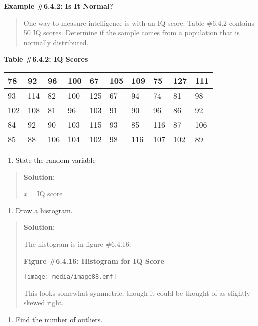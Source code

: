 \documentclass[]{book}
\providecommand{\tightlist}{%
  \setlength{\itemsep}{0pt}\setlength{\parskip}{0pt}}
\begin{document}
\textbf{Example \#6.4.2: Is It Normal?}

\begin{quote}
One way to measure intelligence is with an IQ score. Table \#6.4.2
contains 50 IQ scores. Determine if the sample comes from a population
that is normally distributed.
\end{quote}

\textbf{Table \#6.4.2: IQ Scores}

\begin{longtable}[]{@{}llllllllll@{}}
\toprule
78 & 92 & 96 & 100 & 67 & 105 & 109 & 75 & 127 & 111\tabularnewline
\midrule
\endhead
93 & 114 & 82 & 100 & 125 & 67 & 94 & 74 & 81 & 98\tabularnewline
102 & 108 & 81 & 96 & 103 & 91 & 90 & 96 & 86 & 92\tabularnewline
84 & 92 & 90 & 103 & 115 & 93 & 85 & 116 & 87 & 106\tabularnewline
85 & 88 & 106 & 104 & 102 & 98 & 116 & 107 & 102 & 89\tabularnewline
\bottomrule
\end{longtable}

\begin{enumerate}
\def\labelenumi{\alph{enumi}.}
\tightlist
\item
  State the random variable
\end{enumerate}

\begin{quote}
\textbf{Solution:}

\emph{x} = IQ score
\end{quote}

\begin{enumerate}
\def\labelenumi{\alph{enumi}.}
\setcounter{enumi}{1}
\tightlist
\item
  Draw a histogram.
\end{enumerate}

\begin{quote}
\textbf{Solution:}

The histogram is in figure \#6.4.16.

\textbf{Figure \#6.4.16: Histogram for IQ Score}

\texttt{[image: media/image88.emf]}

This looks somewhat symmetric, though it could be thought of as
slightly skewed right.
\end{quote}

\begin{enumerate}
\def\labelenumi{\alph{enumi}.}
\setcounter{enumi}{2}
\tightlist
\item
  Find the number of outliers.
\end{enumerate}
\end{document}
